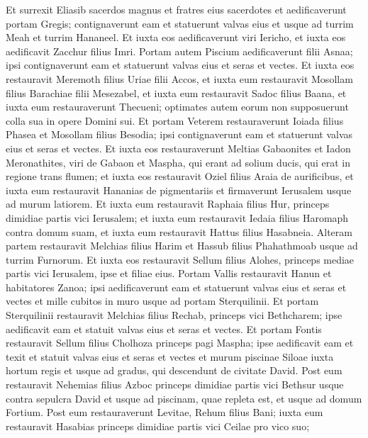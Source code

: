 \begin{biblechapter}  
\verse Et surrexit Eliasib sacerdos magnus et fratres eius sacerdotes et aedificaverunt portam Gregis; contignaverunt eam et statuerunt valvas eius et usque ad turrim Meah et turrim Hananeel. 
\verse Et iuxta eos aedificaverunt viri Iericho, et iuxta eos aedificavit Zacchur filius Imri. 
\verse Portam autem Piscium aedificaverunt filii Asnaa; ipsi contignaverunt eam et statuerunt valvas eius et seras et vectes. 
\verse Et iuxta eos restauravit Meremoth filius Uriae filii Accos, et iuxta eum restauravit Mosollam filius Barachiae filii Mesezabel, et iuxta eum restauravit Sadoc filius Baana, 
\verse et iuxta eum restauraverunt Thecueni; optimates autem eorum non supposuerunt colla sua in opere Domini sui. 
\verse Et portam Veterem restauraverunt Ioiada filius Phasea et Mosollam filius Besodia; ipsi contignaverunt eam et statuerunt valvas eius et seras et vectes.  
\verse Et iuxta eos restauraverunt Meltias Gabaonites et Iadon Meronathites, viri de Gabaon et Maspha, qui erant ad solium ducis, qui erat in regione trans flumen;  
\verse et iuxta eos restauravit Oziel filius Araia de aurificibus, et iuxta eum restauravit Hananias de pigmentariis et firmaverunt Ierusalem usque ad murum latiorem. 
\verse Et iuxta eum restauravit Raphaia filius Hur, princeps dimidiae partis vici Ierusalem; 
\verse et iuxta eum restauravit Iedaia filius Haromaph contra domum suam, et iuxta eum restauravit Hattus filius Hasabneia. 
\verse Alteram partem restauravit Melchias filius Harim et Hassub filius Phahathmoab usque ad turrim Furnorum. 
\verse Et iuxta eos restauravit Sellum filius Alohes, princeps mediae partis vici Ierusalem, ipse et filiae eius. 
\verse Portam Vallis restauravit Hanun et habitatores Zanoa; ipsi aedificaverunt eam et statuerunt valvas eius et seras et vectes et mille cubitos in muro usque ad portam Sterquilinii. 
\verse Et portam Sterquilinii restauravit Melchias filius Rechab, princeps vici Bethcharem; ipse aedificavit eam et statuit valvas eius et seras et vectes. 
\verse Et portam Fontis restauravit Sellum filius Cholhoza princeps pagi Maspha; ipse aedificavit eam et texit et statuit valvas eius et seras et vectes et murum piscinae Siloae iuxta hortum regis et usque ad gradus, qui descendunt de civitate David. 
\verse Post eum restauravit Nehemias filius Azboc princeps dimidiae partis vici Bethsur usque contra sepulcra David et usque ad piscinam, quae repleta est, et usque ad domum Fortium. 
\verse Post eum restauraverunt Levitae, Rehum filius Bani; iuxta eum restauravit Hasabias princeps dimidiae partis vici Ceilae pro vico suo; 

\end{biblechapter}
